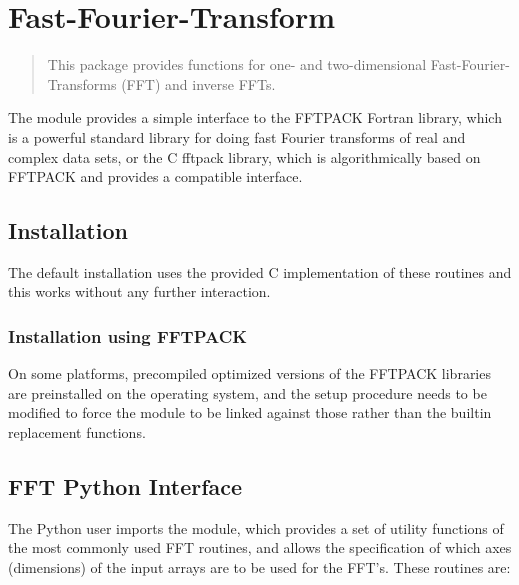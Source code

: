 \chapter{Fast-Fourier-Transform}
\label{cha:fft}

\makeatletter \py@reset \makeatother

\begin{quote}
   This package provides functions for one- and two-dimensional
   Fast-Fourier-Transforms (FFT) and inverse FFTs.
\end{quote}


The  module provides a simple interface to the FFTPACK
Fortran library, which is a powerful standard library for doing fast Fourier
transforms of real and complex data sets, or the C fftpack library, which is
algorithmically based on FFTPACK and provides a compatible interface.


\section{Installation}
\label{sec:FFT:installation}

The default installation uses the provided  C
implementation of these routines and this works without any further
interaction.


\subsection{Installation using FFTPACK}
\label{sec:FFT:install-lapack}

On some platforms, precompiled optimized versions of the FFTPACK libraries are
preinstalled on the operating system, and the setup procedure needs to be
modified to force the  module to be linked against those
rather than the builtin replacement functions.




\section{FFT Python Interface}
\label{sec:FFT:python-interface}

The Python user imports the  module, which provides 
a set of utility functions of the most commonly used FFT routines, and
allows the specification of which axes (dimensions) of the input arrays are to
be used for the FFT's. These routines are:

